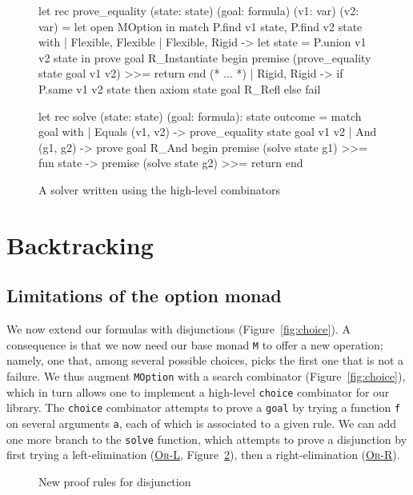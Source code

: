 \documentclass{easychair}
\def\li{\lstinline}
\let\TirName\textsc
\renewcommand{\DefTirName}[1]{\hyperlink{#1}{\TirName {#1}}}
\let\Rule\DefTirName
\newcommand{\fref}[1]{Figure~\ref{fig:#1}}
\begin{document}
\begin{figure}
  \centering
\begin{ocaml}
let rec prove_equality (state: state) (goal: formula) (v1: var) (v2: var) =
  let open MOption in
  match P.find v1 state, P.find v2 state with
  | Flexible, Flexible
  | Flexible, Rigid ->
      let state = P.union v1 v2 state in
      prove goal R_Instantiate begin
        premise (prove_equality state goal v1 v2) >>=
        return
      end
  (* ... *)
  | Rigid, Rigid ->
      if P.same v1 v2 state then
        axiom state goal R_Refl
      else
        fail

let rec solve (state: state) (goal: formula): state outcome =
  match goal with
  | Equals (v1, v2) ->
      prove_equality state goal v1 v2
  | And (g1, g2) ->
      prove goal R_And begin
        premise (solve state g1) >>= fun state ->
        premise (solve state g2) >>=
        return
      end
\end{ocaml}
  \caption{A solver written using the high-level combinators}
  \label{fig:solver2}
\end{figure}

\section{Backtracking}

\subsection{Limitations of the option monad}

We now extend our formulas with disjunctions (\fref{choice}). A consequence
is that we now need our base monad \li+M+ to offer a new operation; namely, one
that, among several possible choices, picks the first one that is not a failure.
We thus augment \li+MOption+ with a search combinator (\fref{choice}), which in
turn allows one to implement a high-level \li+choice+ combinator for our
library. The \li+choice+ combinator attempts to prove a \li+goal+ by trying a
function \li+f+ on several arguments \li+a+, each of which
is associated to a given rule. We can add one more branch to the \li+solve+
function, which attempts to prove a disjunction by first trying a
left-elimination (\Rule{Or-L}, \fref{proof-system2}), then a right-elimination
(\Rule{Or-R}).

\begin{figure}
  \centering
  \begin{mathpar}

  \end{mathpar}
  \caption{New proof rules for disjunction}
  \label{fig:proof-system2}
\end{figure}
\end{document}

